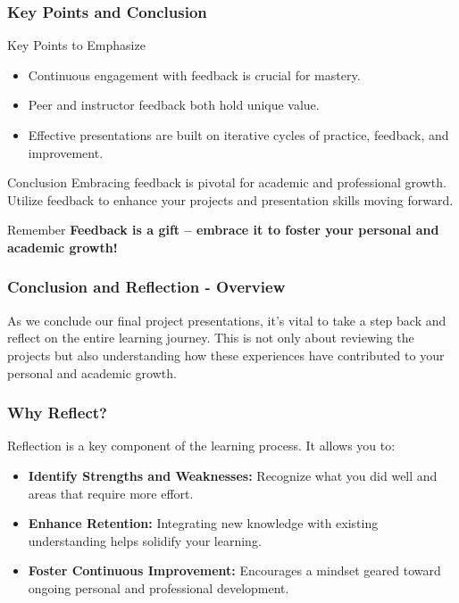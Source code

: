 \documentclass[aspectratio=169]{beamer}
\begin{document}
\begin{frame}[fragile]
    \frametitle{Key Points and Conclusion}
    \begin{block}{Key Points to Emphasize}
        \begin{itemize}
            \item Continuous engagement with feedback is crucial for mastery.
            \item Peer and instructor feedback both hold unique value.
            \item Effective presentations are built on iterative cycles of practice, feedback, and improvement.
        \end{itemize}
    \end{block}
    
    \begin{block}{Conclusion}
        Embracing feedback is pivotal for academic and professional growth. Utilize feedback to enhance your projects and presentation skills moving forward.
    \end{block}
    
    \begin{block}{Remember}
        \textbf{Feedback is a gift – embrace it to foster your personal and academic growth!}
    \end{block}
\end{frame}

\begin{frame}[fragile]
    \frametitle{Conclusion and Reflection - Overview}
    As we conclude our final project presentations, it's vital to take a step back and reflect on the entire learning journey. This is not only about reviewing the projects but also understanding how these experiences have contributed to your personal and academic growth.
\end{frame}

\begin{frame}[fragile]
    \frametitle{Why Reflect?}
    Reflection is a key component of the learning process. It allows you to:
    \begin{itemize}
        \item \textbf{Identify Strengths and Weaknesses:} Recognize what you did well and areas that require more effort.
        \item \textbf{Enhance Retention:} Integrating new knowledge with existing understanding helps solidify your learning.
        \item \textbf{Foster Continuous Improvement:} Encourages a mindset geared toward ongoing personal and professional development.
    \end{itemize}
\end{frame}
\end{document}
